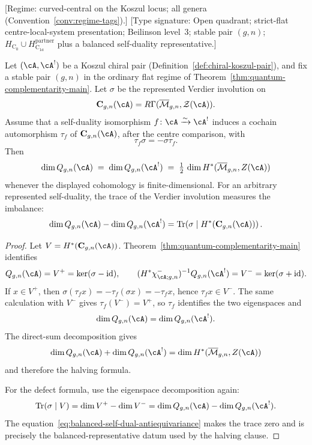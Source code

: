 \begin{theorem}\label{thm:self-dual-halving}
\textup{[Regime: curved-central on the Koszul locus; all genera
\textup{(}Convention~\textup{\ref{conv:regime-tags})}.]}
\textup{[Type signature: Open quadrant; strict-flat
centre-local-system presentation; Beilinson level~3; stable pair
\((g,n)\); \(H_{\mathrm C_0}\cup
H_{\mathrm C_{1a}}^{\mathrm{partner}}\) plus a balanced self-duality
representative.]}

Let $(\cA, \cA^!)$ be a Koszul chiral pair
(Definition~\ref{def:chiral-koszul-pair}), and fix a stable pair
\((g,n)\) in
the ordinary flat regime of Theorem~\ref{thm:quantum-complementarity-main}.
Let $\sigma$ be the represented Verdier involution on
\[
 \mathbf C_{g,n}(\cA)=R\Gamma(\overline{\mathcal M}_{g,n},\mathcal Z(\cA)).
\]
Assume that a self-duality isomorphism
$f\colon \cA\xrightarrow{\sim}\cA^!$ induces a cochain automorphism
$\tau_f$ of $\mathbf C_{g,n}(\cA)$, after the centre comparison, with
\begin{equation}\label{eq:balanced-self-dual-antiequivariance}
 \tau_f\sigma=-\sigma\tau_f .
\end{equation}
Then
\begin{equation}\label{eq:self-dual-halving}
\dim Q_{g,n}(\cA) \;=\; \dim Q_{g,n}(\cA^!)
\;=\; \tfrac{1}{2}\,\dim H^*(\overline{\mathcal{M}}_{g,n}, Z(\cA))
\end{equation}
whenever the displayed cohomology is finite-dimensional.  For an
arbitrary represented self-duality, the trace of the Verdier
involution measures the imbalance:
\begin{equation}\label{eq:self-dual-trace-defect}
\dim Q_{g,n}(\cA)-\dim Q_{g,n}(\cA^!)
=
\operatorname{Tr}\!\left(\sigma\mid
H^*(\mathbf C_{g,n}(\cA))\right).
\end{equation}
\end{theorem}

\begin{proof}
Let $V=H^*(\mathbf C_{g,n}(\cA))$. Theorem~\ref{thm:quantum-complementarity-main}
identifies
\[
Q_{g,n}(\cA)=V^+=\ker(\sigma-\mathrm{id}),\qquad
(H^*\chi^-_{\cA;g,n})^{-1}Q_{g,n}(\cA^!)
=V^-=\ker(\sigma+\mathrm{id}).
\]
If $x\in V^+$, then
$\sigma(\tau_f x)=-\tau_f(\sigma x)=-\tau_f x$, hence
$\tau_f x\in V^-$. The same calculation with $V^-$ gives
$\tau_f(V^-)=V^+$, so $\tau_f$ identifies the two eigenspaces and
\[
\dim Q_{g,n}(\cA)=\dim Q_{g,n}(\cA^!).
\]
The direct-sum decomposition gives
\[
\dim Q_{g,n}(\cA) + \dim Q_{g,n}(\cA^!)
= \dim H^*(\overline{\mathcal{M}}_{g,n}, Z(\cA))
\]
and therefore the halving formula.

For the defect formula, use the eigenspace decomposition again:
\[
\operatorname{Tr}(\sigma\mid V)
=\dim V^+ - \dim V^-
=\dim Q_{g,n}(\cA)-\dim Q_{g,n}(\cA^!).
\]
The equation~\eqref{eq:balanced-self-dual-antiequivariance} makes the
trace zero and is precisely the balanced-representative datum used by
the halving clause.
\end{proof}

